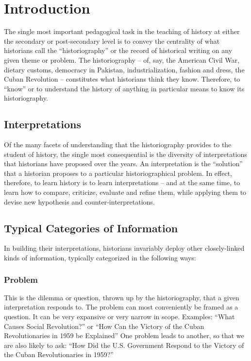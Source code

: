 \chapter{Introduction}
The single most important pedagogical task in the teaching of history at either the secondary or post-secondary level is to convey the centrality of what historians call the “historiography” or the record of historical writing on any given theme or problem.  The historiography – of, say, the American Civil War, dietary customs, democracy in Pakistan, industrialization, fashion and dress, the Cuban Revolution – constitutes what historians think they know.  Therefore, to “know” or to understand the history of anything in particular means to know its historiography.

\section{Interpretations}
Of the many facets of understanding that the historiography provides to the student of history, the single most consequential is the diversity of interpretations that historians have proposed over the years.  An interpretation is the “solution” that a historian proposes to a particular historiographical problem.  In effect, therefore, to learn history is to learn interpretations – and at the same time, to learn how to compare, criticize, evaluate and refine them, while applying them to devise new hypothesis and counter-interpretations.

\section{Typical Categories of Information}
In building their interpretations, historians invariably deploy other closely-linked kinds of information, typically categorized in the following ways:
\subsection{Problem}
This is the dilemma or question, thrown up by the historiography, that a given interpretation responds to.  The problem can most conveniently be framed as a question.  It can be very expansive or very narrow in scope.  Examples:  ``What Causes Social Revolution?'' or ``How Can the Victory of the Cuban Revolutionaries in 1959 be Explained''  One problem leads to another, so that we are also likely to ask:  ``How Did the U.S. Government Respond to the Victory of the Cuban Revolutionaries in 1959?''
